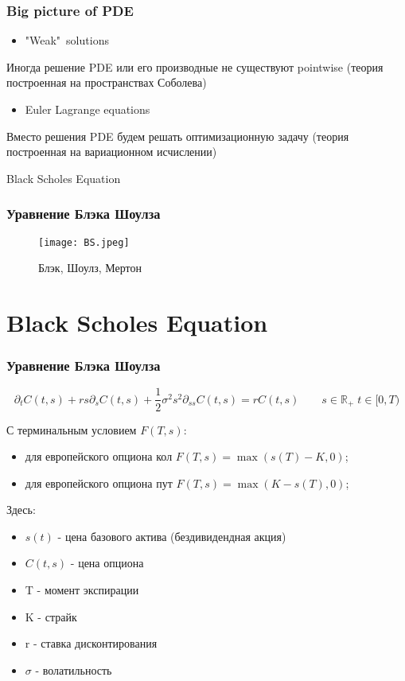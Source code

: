 \documentclass{beamer}
\begin{document}
\begin{frame}
\frametitle{Big picture of PDE}

\begin{itemize}
    \item "Weak"\ solutions
\end{itemize}

Иногда решение PDE или его производные не существуют pointwise (теория построенная на пространствах Соболева)

\begin{itemize}
    \item Euler Lagrange equations
\end{itemize}

Вместо решения PDE будем решать оптимизационную задачу (теория построенная на вариационном исчислении)

\end{frame}


\begin{frame}

Black Scholes Equation


\end{frame}

\begin{frame}
\frametitle{Уравнение Блэка Шоулза}
\begin{figure}
    \centering
    \texttt{[image: BS.jpeg]}
    \caption{Блэк, Шоулз, Мертон}
\end{figure}
\end{frame}


\section{Black Scholes Equation}
\begin{frame}
\frametitle{Уравнение Блэка Шоулза}

\[ \!\!\!\! \partial_t C(t, s) + r s \partial_s C(t, s) + \frac{1}{2} \sigma^2 s^2 \partial_{ss} C(t, s) = r C(t, s) \quad \quad s \in \mathbb{R}_+ \; t \in [0, T)\]

С терминальным условием \(F(T, s)\): 

\begin{itemize}
    \item для европейского опциона кол \(F(T, s) = \max(s(T) - K, 0)\);
    \item для европейского опциона пут \(F(T, s) = \max(K - s(T), 0)\);
\end{itemize}

Здесь:

\begin{itemize}
    \item $s(t)$ - цена базового актива (бездивидендная акция)
    \item $C(t, s)$ - цена опциона
    \item T - момент экспирации
    \item K - страйк 
    \item r - ставка дисконтирования
    \item $\sigma$ - волатильность
\end{itemize}

\end{frame}
\end{document}
